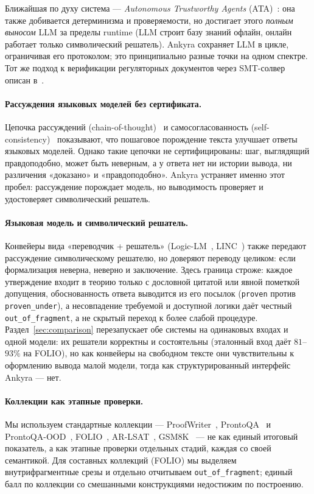 \documentclass[11pt,a4paper]{article}
\begin{document}
Ближайшая по духу система — \emph{Autonomous Trustworthy Agents} (ATA)~\cite{ata}: она также добивается детерминизма
и проверяемости, но достигает этого \emph{полным выносом} LLM за пределы runtime (LLM строит базу знаний офлайн,
онлайн работает только символический решатель). Ankyra сохраняет LLM в цикле, ограничивая его протоколом; это
принципиально разные точки на одном спектре. Тот же подход к верификации регуляторных документов через SMT-солвер
описан в~\cite{nsc}.

\paragraph{Рассуждения языковых моделей без сертификата.} Цепочка рассуждений (chain-of-thought)~\cite{cot} и
самосогласованность (self-consistency)~\cite{selfconsistency} показывают, что пошаговое порождение текста
улучшает ответы языковых моделей. Однако такие цепочки не сертифицированы: шаг, выглядящий правдоподобно,
может быть неверным, а у ответа нет ни истории вывода, ни различения «доказано» и «правдоподобно». Ankyra
устраняет именно этот пробел: рассуждение порождает модель, но выводимость проверяет и удостоверяет
символический решатель.

\paragraph{Языковая модель и символический решатель.} Конвейеры вида «переводчик + решатель» (Logic-LM~\cite{logiclm},
LINC~\cite{linc}) также передают рассуждение символическому решателю, но доверяют переводу целиком: если
формализация неверна, неверно и заключение. Здесь граница строже: каждое утверждение входит в теорию только
с дословной цитатой или явной пометкой допущения, обоснованность ответа выводится из его посылок
(\texttt{proven} против \texttt{proven\_under}), а несовпадение требуемой и доступной логики даёт
честный \texttt{out\_of\_fragment}, а не скрытый переход к более слабой процедуре. Раздел~\ref{sec:comparison}
перезапускает обе системы на одинаковых входах и одной модели: их решатели корректны и состоятельны (эталонный
вход даёт $81$--$93\%$ на FOLIO), но как конвейеры на свободном тексте они чувствительны к оформлению вывода малой
модели, тогда как структурированный интерфейс Ankyra — нет.

\paragraph{Коллекции как этапные проверки.} Мы используем стандартные коллекции — ProofWriter~\cite{proofwriter},
ProntoQA~\cite{prontoqa} и ProntoQA-OOD~\cite{prontoqaood}, FOLIO~\cite{folio}, AR-LSAT~\cite{arlsat},
GSM8K~\cite{gsm8k} — не как единый итоговый показатель,
а как этапные проверки отдельных стадий, каждая со своей семантикой. Для составных коллекций (FOLIO)
мы выделяем внутрифрагментные срезы и отдельно отчитываем \texttt{out\_of\_fragment}; единый балл
по коллекции со смешанными конструкциями недостижим по построению.
\end{document}
